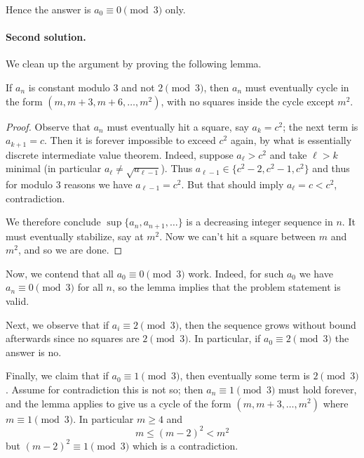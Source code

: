 Hence the answer is $a_0 \equiv 0 \pmod 3$ only.

\paragraph{Second solution.}
We clean up the argument by proving the following lemma.
\begin{lemma*}
  If $a_n$ is constant modulo $3$ and not $2 \pmod 3$,
  then $a_n$ must eventually cycle in the form
  $(m, m+3, m+6, \dots, m^2)$,
  with no squares inside the cycle except $m^2$.
\end{lemma*}
\begin{proof}
  Observe that $a_n$ must eventually hit a square, say $a_k = c^2$;
  the next term is $a_{k+1} = c$.
  Then it is forever impossible to exceed $c^2$ again,
  by what is essentially discrete intermediate value theorem.
  Indeed, suppose $a_\ell > c^2$ and take $\ell > k$ minimal
  (in particular $a_{\ell} \neq \sqrt{a_{\ell-1}}$).
  Thus $a_{\ell-1} \in \{c^2-2, c^2-1, c^2\}$
  and thus for modulo $3$ reasons we have $a_{\ell-1} = c^2$.
  But that should imply $a_\ell = c < c^2$, contradiction.

  We therefore conclude $\sup \{a_n, a_{n+1}, \dots \}$ is a
  decreasing integer sequence in $n$.
  It must eventually stabilize, say at $m^2$.
  Now we can't hit a square between $m$ and $m^2$,
  and so we are done.
\end{proof}

Now, we contend that all $a_0 \equiv 0 \pmod 3$ work.
Indeed, for such $a_0$ we have $a_n \equiv 0 \pmod 3$ for all $n$,
so the lemma implies that the problem statement is valid.

Next, we observe that if $a_i \equiv 2 \pmod 3$,
then the sequence grows without bound afterwards
since no squares are $2 \pmod 3$.
In particular, if $a_0 \equiv 2 \pmod 3$ the answer is no.

Finally, we claim that if $a_0 \equiv 1 \pmod 3$,
then eventually some term is $2 \pmod 3$.
Assume for contradiction this is not so;
then $a_n \equiv 1 \pmod 3$ must hold forever,
and the lemma applies to give us a cycle of the form
$(m, m+3, \dots, m^2)$ where $m \equiv 1 \pmod 3$.
In particular $m \ge 4$ and
\[ m \le (m-2)^2 < m^2 \]
but $(m-2)^2 \equiv 1 \pmod 3$ which is a contradiction.
